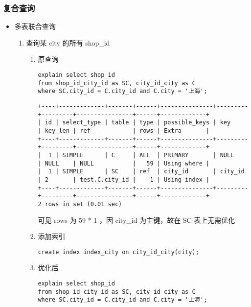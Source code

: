 \documentclass[11pt]{article}
\begin{document}
\subsubsection{复合查询}
\label{sec-3-2-2}
\begin{itemize}
\item 多表联合查询
\label{sec-3-2-2-1}
\begin{enumerate}
\item 查询某 city 的所有 shop\_id
\begin{enumerate}
\item 原查询

\begin{lstlisting}
explain select shop_id
from shop_id_city_id as SC, city_id_city as C
where SC.city_id = C.city_id and C.city = '上海';
\end{lstlisting}

\begin{verbatim}
+----+-------------+-------+------+---------------+---------+---------+----------------+------+-------------+
| id | select_type | table | type | possible_keys | key     | key_len | ref            | rows | Extra       |
+----+-------------+-------+------+---------------+---------+---------+----------------+------+-------------+
|  1 | SIMPLE      | C     | ALL  | PRIMARY       | NULL    | NULL    | NULL           |   59 | Using where |
|  1 | SIMPLE      | SC    | ref  | city_id       | city_id | 2       | test.C.city_id |    1 | Using index |
+----+-------------+-------+------+---------------+---------+---------+----------------+------+-------------+
2 rows in set (0.01 sec)
\end{verbatim}

可见 rows 为 59 * 1 ，因 city\_id 为主键，故在 SC 表上无需优化

\item 添加索引

\begin{lstlisting}
create index index_city on city_id_city(city);
\end{lstlisting}

\item 优化后

\begin{lstlisting}
explain select shop_id
from shop_id_city_id as SC, city_id_city as C
where SC.city_id = C.city_id and C.city = '上海';
\end{lstlisting}


\end{enumerate}
\end{enumerate}
\end{itemize}
\end{document}
